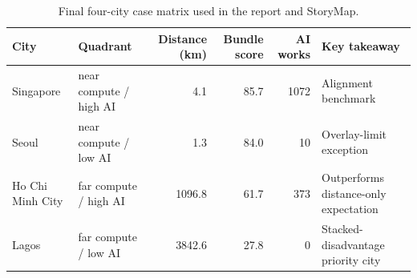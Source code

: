 \begin{table}[ht]
\centering
\small
\begin{tabular}{p{}p{}rrrp{}}
\toprule
City & Quadrant & Distance (km) & Bundle score & AI works & Key takeaway \\ 
\midrule
Singapore & near compute / high AI & 4.1 & 85.7 & 1072 & Alignment benchmark \\ 
Seoul & near compute / low AI & 1.3 & 84.0 & 10 & Overlay-limit exception \\ 
Ho Chi Minh City & far compute / high AI & 1096.8 & 61.7 & 373 & Outperforms distance-only expectation \\ 
Lagos & far compute / low AI & 3842.6 & 27.8 & 0 & Stacked-disadvantage priority city \\ 
\bottomrule
\end{tabular}
\caption{Final four-city case matrix used in the report and StoryMap.}
\label{tab:case_matrix}
\end{table}
